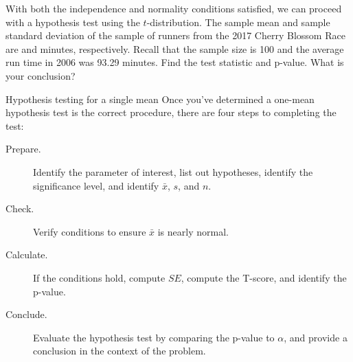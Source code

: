 \begin{exercisewrap}
\begin{nexercise}
With both the independence and normality conditions satisfied,
we can proceed with a hypothesis test using
the $t$-distribution.
The sample mean and sample standard deviation of the sample
of \cherryblossomn{} runners from the 2017 Cherry Blossom Race
are \cherryblossommean{} and \cherryblossomsd{} minutes,
respectively.
Recall that the sample size is 100
and the average run time in 2006 was 93.29 minutes.
Find the test statistic and p-value.
What is your conclusion?\footnotemark{}
\end{nexercise}
\end{exercisewrap}


\begin{onebox}{Hypothesis testing for a single mean}
  Once you've determined a one-mean hypothesis test is the
  correct procedure, there are four steps to completing the
  test:
  \begin{description}
  \item[Prepare.]
      Identify the parameter of interest,
      list out hypotheses,
      identify the significance level,
      and identify $\bar{x}$, $s$, and $n$.
  \item[Check.]
      Verify conditions to ensure $\bar{x}$ is nearly normal.
  \item[Calculate.]
      If the conditions hold, compute $SE$,
      compute the T-score, and identify the p-value.
  \item[Conclude.]
      Evaluate the hypothesis test by comparing the p-value
      to $\alpha$, and provide a conclusion in the context
      of the problem.
  \end{description}
\end{onebox}

